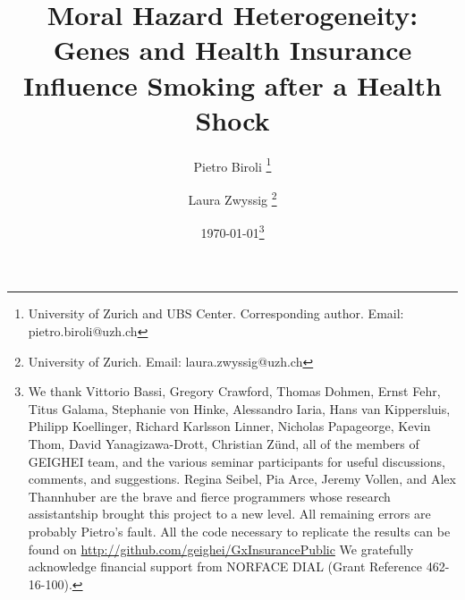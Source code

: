 \documentclass[11pt]{article}
\begin{document}
\title{
Moral Hazard Heterogeneity: \\ Genes and Health Insurance Influence Smoking after a Health Shock
%
}

\author{
Pietro Biroli \thanks{University of Zurich and UBS Center. Corresponding author. {Email: pietro.biroli@uzh.ch}}
\and
Laura Zwyssig \thanks{
University of Zurich. {Email: laura.zwyssig@uzh.ch}}
}

\date{
\today \thanks{
We thank
Vittorio Bassi,
Gregory Crawford,
Thomas Dohmen,
Ernst Fehr,
Titus Galama,
Stephanie von Hinke,
Alessandro Iaria,
Hans van Kippersluis,
Philipp Koellinger,
Richard Karlsson Linner,
Nicholas Papageorge,
Kevin Thom,
David Yanagizawa-Drott,
Christian Z\"und,
all of the members of GEIGHEI team, and the various seminar participants for useful discussions, comments, and suggestions.
Regina Seibel, Pia Arce, Jeremy Vollen, and Alex Thannhuber are the brave and fierce programmers whose research assistantship brought this project to a new level.
All remaining errors are probably Pietro's fault.
All the code necessary to replicate the results can be found on \url{http://github.com/geighei/GxInsurancePublic}
We gratefully acknowledge financial support from NORFACE DIAL (Grant Reference 462-16-100).
} %
} %

\maketitle
\end{document}
